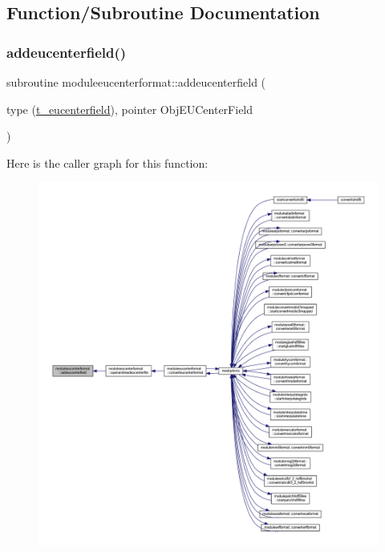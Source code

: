 \subsection{Function/\+Subroutine Documentation}
\mbox{\label{namespacemoduleeucenterformat_ae1108c503ba34758ca91c475847a0a95}} 
\subsubsection{\texorpdfstring{addeucenterfield()}{addeucenterfield()}}
{\footnotesize\ttfamily subroutine moduleeucenterformat\+::addeucenterfield (\begin{DoxyParamCaption}\item[{type (\mbox{\hyperlink{structmoduleeucenterformat_1_1t__eucenterfield}{t\+\_\+eucenterfield}}), pointer}]{Obj\+E\+U\+Center\+Field }\end{DoxyParamCaption})\hspace{0.3cm}{\ttfamily [private]}}

Here is the caller graph for this function\+:\nopagebreak
\begin{figure}[H]
\begin{center}
\leavevmode
\includegraphics[width=350pt]{namespacemoduleeucenterformat_ae1108c503ba34758ca91c475847a0a95_icgraph}
\end{center}
\end{figure}
\mbox{\label{namespacemoduleeucenterformat_a363ea37d06e552dd3191189238b401fc}} 
